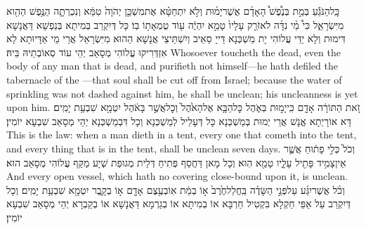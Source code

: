 {כׇּֽל\maqqaf הַנֹּגֵ֡עַ בְּמֵ֣ת בְּנֶ֩פֶשׁ֩ הָאָדָ֨ם אֲשֶׁר\maqqaf יָמ֜וּת וְלֹ֣א יִתְחַטָּ֗א אֶת\maqqaf מִשְׁכַּ֤ן יְהֹוָה֙ טִמֵּ֔א וְנִכְרְתָ֛ה הַנֶּ֥פֶשׁ הַהִ֖וא מִיִּשְׂרָאֵ֑ל כִּי֩ מֵ֨י נִדָּ֜ה לֹא\maqqaf זֹרַ֤ק עָלָיו֙ טָמֵ֣א יִהְיֶ֔ה ע֖וֹד טֻמְאָת֥וֹ בֽוֹ׃}
{כָּל דְּיִקְרַב בְּמִיתָא בְּנַפְשָׁא דַּאֲנָשָׁא דִּימוּת וְלָא יַדֵּי עֲלוֹהִי יָת מַשְׁכְּנָא דַּייָ סַאֵיב וְיִשְׁתֵּיצֵי אֲנָשָׁא הַהוּא מִיִּשְׂרָאֵל אֲרֵי מֵי אַדָּיוּתָא לָא אִזְדְּרִיקוּ עֲלוֹהִי מְסָאַב יְהֵי עוֹד סְאוֹבְתֵיהּ בֵּיהּ׃}
{Whosoever toucheth the dead, even the body of any man that is dead, and purifieth not himself—he hath defiled the tabernacle of the \lord—that soul shall be cut off from Israel; because the water of sprinkling was not dashed against him, he shall be unclean; his uncleanness is yet upon him.}{}
{זֹ֚את הַתּוֹרָ֔ה אָדָ֖ם כִּֽי\maqqaf יָמ֣וּת בְּאֹ֑הֶל כׇּל\maqqaf הַבָּ֤א אֶל\maqqaf הָאֹ֙הֶל֙ וְכׇל\maqqaf אֲשֶׁ֣ר בָּאֹ֔הֶל יִטְמָ֖א שִׁבְעַ֥ת יָמִֽים׃}
{דָּא אוֹרָיְתָא אֱנָשׁ אֲרֵי יְמוּת בְּמַשְׁכְּנָא כָּל דְּעָלֵיל לְמַשְׁכְּנָא וְכָל דִּבְמַשְׁכְּנָא יְהֵי מְסָאַב שִׁבְעָא יוֹמִין׃}
{This is the law: when a man dieth in a tent, every one that cometh into the tent, and every thing that is in the tent, shall be unclean seven days.}{}
{וְכֹל֙ כְּלִ֣י פָת֔וּחַ אֲשֶׁ֛ר אֵין\maqqaf צָמִ֥יד פָּתִ֖יל עָלָ֑יו טָמֵ֖א הֽוּא׃}
{וְכָל מָאן דַּחֲסַף פְּתִיחַ דְּלֵית מְגוּפַת שְׁיָע מַקַּף עֲלוֹהִי מְסָאַב הוּא׃}
{And every open vessel, which hath no covering close-bound upon it, is unclean.}{}
{וְכֹ֨ל אֲשֶׁר\maqqaf יִגַּ֜ע עַל\maqqaf פְּנֵ֣י הַשָּׂדֶ֗ה בַּֽחֲלַל\maqqaf חֶ֙רֶב֙ א֣וֹ בְמֵ֔ת אֽוֹ\maqqaf בְעֶ֥צֶם אָדָ֖ם א֣וֹ בְקָ֑בֶר יִטְמָ֖א שִׁבְעַ֥ת יָמִֽים׃}
{וְכָל דְּיִקְרַב עַל אַפֵּי חַקְלָא בִּקְטִיל חַרְבָּא אוֹ בְמִיתָא אוֹ בְגַרְמָא דַּאֲנָשָׁא אוֹ בְקַבְרָא יְהֵי מְסָאַב שִׁבְעָא יוֹמִין׃}
